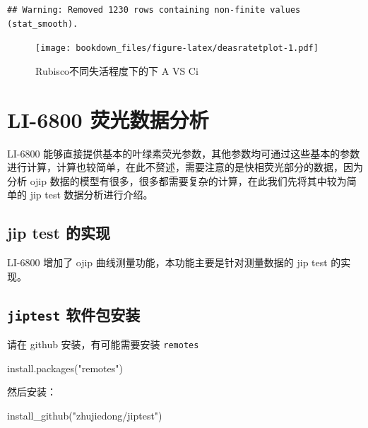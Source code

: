 \documentclass[
]{krantz}
\makeatletter
\newenvironment{Shaded}{\begin{snugshade}}{\end{snugshade}}
\newcommand{\FunctionTok}[1]{\textcolor[rgb]{0.00,0.00,0.00}{#1}}
\newcommand{\NormalTok}[1]{#1}
\newcommand{\StringTok}[1]{\textcolor[rgb]{0.31,0.60,0.02}{#1}}
\newenvironment{kframe}{%
\medskip{}
\setlength{\fboxsep}{.8em}
 \def\at@end@of@kframe{}%
 \ifinner\ifhmode%
  \def\at@end@of@kframe{\end{minipage}}%
  \begin{minipage}{\columnwidth}%
 \fi\fi%
 \def\FrameCommand##1{\hskip\@totalleftmargin \hskip-\fboxsep
 \colorbox{shadecolor}{##1}\hskip-\fboxsep
     \hskip-\linewidth \hskip-\@totalleftmargin \hskip\columnwidth}%
 \MakeFramed {\advance\hsize-\width
   \@totalleftmargin\z@ \linewidth\hsize
   \@setminipage}}%
 {\par\unskip\endMakeFramed%
 \at@end@of@kframe}
\renewenvironment{Shaded}{\begin{kframe}}{\end{kframe}}
\makeatother
\begin{document}
\begin{verbatim}
## Warning: Removed 1230 rows containing non-finite values (stat_smooth).
\end{verbatim}

\begin{figure}
\centering
\texttt{[image: bookdown\_files/figure-latex/deasratetplot-1.pdf]}
\caption{\label{fig:deasratetplot}Rubisco不同失活程度下的下 A VS Ci}
\end{figure}

\cleardoublepage

\hypertarget{fluro68}{%
\section{LI-6800 荧光数据分析}\label{fluro68}}

LI-6800 能够直接提供基本的叶绿素荧光参数，其他参数均可通过这些基本的参数进行计算，计算也较简单，在此不赘述，需要注意的是快相荧光部分的数据，因为分析 ojip 数据的模型有很多，很多都需要复杂的计算，在此我们先将其中较为简单的 jip test 数据分析进行介绍。

\hypertarget{jiptest}{%
\subsection{jip test 的实现}\label{jiptest}}

LI-6800 增加了 ojip 曲线测量功能，本功能主要是针对测量数据的 jip test 的实现。

\hypertarget{jiptest_pack}{%
\subsection{\texorpdfstring{\texttt{jiptest} 软件包安装}{jiptest 软件包安装}}\label{jiptest_pack}}

请在 github 安装，有可能需要安装 \texttt{remotes}

\begin{Shaded}
\begin{Highlighting}[]
\FunctionTok{install.packages}\NormalTok{(}\StringTok{"remotes"}\NormalTok{)}
\end{Highlighting}
\end{Shaded}

然后安装：

\begin{Shaded}
\begin{Highlighting}[]
\FunctionTok{install\_github}\NormalTok{(}\StringTok{"zhujiedong/jiptest"}\NormalTok{)}
\end{Highlighting}
\end{Shaded}
\end{document}
